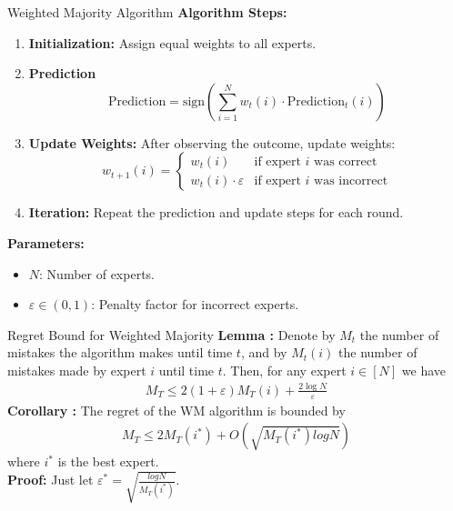 \documentclass{beamer}
\begin{document}
\begin{frame}{Weighted Majority Algorithm}
  \textbf{Algorithm Steps:}
  \begin{enumerate}
    \item \textbf{Initialization:} Assign equal weights to all experts.
    \item \textbf{Prediction}
          \[
            \text{Prediction} = \text{sign}\left(\sum_{i=1}^{N} w_t(i) \cdot \text{Prediction}_t(i)\right)
          \]
    \item \textbf{Update Weights:} After observing the outcome, update weights:
          \[
            w_{t+1}(i) =
            \begin{cases}
              w_t(i)                   & \text{if expert } i \text{ was correct}   \\
              w_t(i) \cdot \varepsilon & \text{if expert } i \text{ was incorrect}
            \end{cases}
          \]
    \item \textbf{Iteration:} Repeat the prediction and update steps for each round.
  \end{enumerate}
  \textbf{Parameters:}
  \begin{itemize}
    \item $N$: Number of experts.
    \item $\varepsilon \in (0,1)$: Penalty factor for incorrect experts.
  \end{itemize}
\end{frame}

\begin{frame}{Regret Bound for Weighted Majority}
  \textbf{Lemma :} Denote by $M_t$ the number of mistakes the algorithm makes until time $t$, and by $M_t(i)$ the number of mistakes made by expert $i$ until time $t$. Then, for any expert $i \in [N]$ we have
  \begin{align*}
    M_T \leq 2(1+\varepsilon)M_T(i) + \frac{2\log N}{\varepsilon}
  \end{align*}
  \vspace{0.5 em}
  \textbf{Corollary :} The regret of the WM algorithm is bounded by
  \begin{align*}
    M_T \leq 2M_T(i^*) + O(\sqrt{M_T(i^*) log N})
  \end{align*}
  where $i^*$ is the best expert.\\
  \vspace{0.5 em}
  \textbf{Proof:} Just let $\varepsilon^* = \sqrt{\frac{log N}{M_T(i^*)}}$.
\end{frame}
\end{document}
